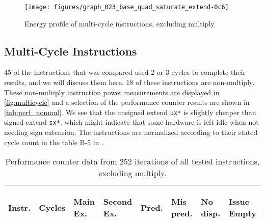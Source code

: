 \begin{figure}
    \centering
    \texttt{[image: figures/graph\_023\_base\_quad\_saturate\_extend-0c6]}
    \caption{Energy profile of multi-cycle instructions, excluding multiply.}
    \label{fig:multicycle}
\end{figure}


\subsection{Multi-Cycle Instructions}


45 of the instructions that was compared used 2 or 3 cycles to complete their
results, and we will discuss them here. 18 of these instructions are
non-multiply. These non-multiply instruction power measurements are displayed in
\autoref{fig:multicycle} and a selection of the performance counter results are
shown in \autoref{tab:perf_nonmul}. We see that the unsigned extend \texttt{ux*}
is slightly cheaper than signed extend \texttt{sx*}, which might indicate that
some hardware is left idle when not needing sign extension. The instructions are
normalized according to their stated cycle count in the table B-5 in
\cite{armtech}.


\begin{table}
    \centering
    \begin{tabular}{|p{0.7cm}|R{0.8cm}R{0.6cm}R{0.85cm}R{0.6cm}R{0.45cm}R{0.75cm}R{0.72cm}|}
        \hline
        \centering
        Instr. &
        \centering
        Cycles &
        \centering
        Main Ex. &
        \centering
        Second Ex. &
        \centering
        Pred.&
        \centering
        Mis pred.&
        \centering
        No disp. &
        \begin{centering}
        Issue Empty
        \end{centering}
        \\
        \hline
        
        \hline
    \end{tabular}
    \caption{Performance counter data from 252 iterations of all tested
    instructions, excluding multiply.}
    \label{tab:perf_nonmul}
    \hfill
\end{table}

